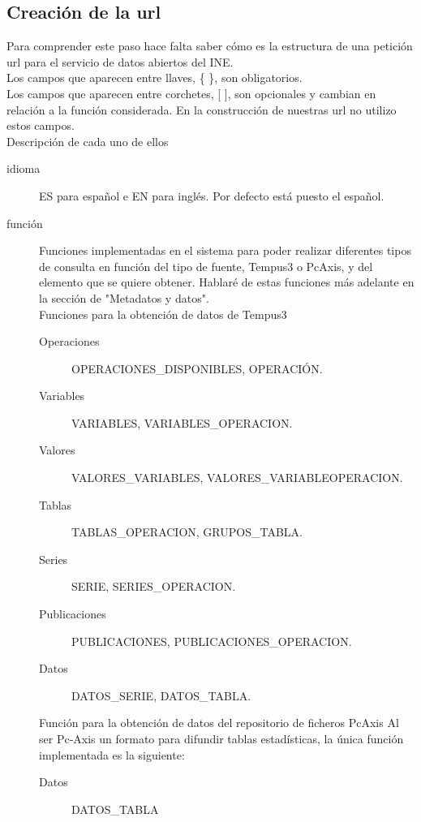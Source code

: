  \subsection{Creación de la url}
 Para comprender este paso hace falta saber cómo es la estructura de una petición url para el servicio de datos abiertos del INE. \cite{ine:urljson}\\
Los campos que aparecen entre llaves, \{ \}, son obligatorios.\\
Los campos que aparecen entre corchetes, [ ], son opcionales y cambian en relación a la función considerada. En la construcción de nuestras url no utilizo estos campos.\\
Descripción de cada uno de ellos
\begin{description}
	\item [idioma] ES para español e EN para inglés. Por defecto está puesto el español.\\
	\item [función] Funciones implementadas en el sistema para poder realizar diferentes tipos de consulta en función del tipo de fuente, Tempus3 o PcAxis, y del elemento que se quiere obtener. Hablaré de estas funciones más adelante en la sección de "Metadatos y datos".\\
    Funciones para la obtención de datos de Tempus3
         \begin{description}
         \item [Operaciones] OPERACIONES\_DISPONIBLES, OPERACIÓN.
         \item [Variables] VARIABLES, VARIABLES\_OPERACION.
         \item [Valores] VALORES\_VARIABLES, VALORES\_VARIABLEOPERACION.
         \item [Tablas] TABLAS\_OPERACION, GRUPOS\_TABLA.
         \item [Series] SERIE, SERIES\_OPERACION.
         \item [Publicaciones] PUBLICACIONES, PUBLICACIONES\_OPERACION.
         \item [Datos] DATOS\_SERIE, DATOS\_TABLA.
         \end{description}
    Función para la obtención de datos del repositorio de ficheros PcAxis Al ser Pc-Axis un formato para difundir tablas estadísticas, la única función implementada es la siguiente:
         \begin{description}
         \item [Datos] DATOS\_TABLA
         \end{description}

\end{description}
